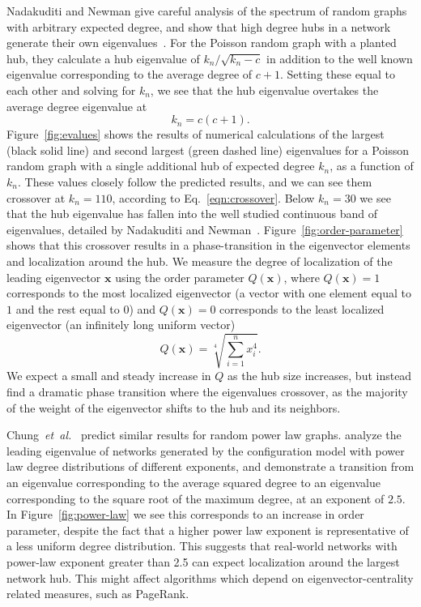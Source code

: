 \documentclass[twocolumn,prl,superscriptaddress]{revtex4}
\newcommand{\etal}{{\it{}et~al.}}
\renewcommand{\vec}{\mathbf}
\begin{document}
Nadakuditi and Newman give careful analysis of the spectrum of random graphs with arbitrary expected degree, and show that high degree hubs in a network generate their own eigenvalues~\cite{nadakuditi13}. For the Poisson random graph with a planted hub, they calculate a hub eigenvalue of $k_n / \sqrt{k_n - c}$ in addition to the well known eigenvalue corresponding to the average degree of $c+1$. Setting these equal to each other and solving for $k_n$, we see that the hub eigenvalue overtakes the average degree eigenvalue at
\begin{equation}
k_n = c(c+1).
\label{eqn:crossover}
\end{equation}
Figure~\ref{fig:evalues} shows the results of numerical calculations of the largest (black solid line) and second largest (green dashed line) eigenvalues for a Poisson random graph with a single additional hub of expected degree $k_n$, as a function of $k_n$. These values closely follow the predicted results, and we can see them crossover at $k_n = 110$, according to Eq.~\ref{eqn:crossover}. Below $k_n = 30$ we see that the hub eigenvalue has fallen into the well studied continuous band of eigenvalues, detailed by Nadakuditi and Newman~\cite{nadakuditi13}. Figure~\ref{fig:order-parameter} shows that this crossover results in a phase-transition in the eigenvector elements and localization around the hub. We measure the degree of localization of the leading eigenvector $\vec{x}$ using the order parameter $Q(\vec{x})$, where $Q(\vec{x}) = 1$ corresponds to the most localized eigenvector (a vector with one element equal to $1$ and the rest equal to $0$) and $Q(\vec{x}) = 0$ corresponds to the least localized eigenvector (an infinitely long uniform vector)
\[Q(\vec{x}) = \sqrt[4]{\sum_{i=1}^n x_i ^ 4}.\]
We expect a small and steady increase in $Q$ as the hub size increases, but instead find a dramatic phase transition where the eigenvalues crossover, as the majority of the weight of the eigenvector shifts to the hub and its neighbors.

Chung~\etal~\cite{chung03} predict similar results for random power law graphs.  analyze the leading eigenvalue of networks generated by the configuration model with power law degree distributions of different exponents, and demonstrate a transition from an eigenvalue corresponding to the average squared degree to an eigenvalue corresponding to the square root of the maximum degree, at an exponent of $2.5$. In Figure~\ref{fig:power-law} we see this corresponds to an increase in order parameter, despite the fact that a higher power law exponent is representative of a less uniform degree distribution. This suggests that real-world networks with power-law exponent greater than 2.5 can expect localization around the largest network hub. This might affect algorithms which depend on eigenvector-centrality related measures, such as PageRank.
\end{document}
